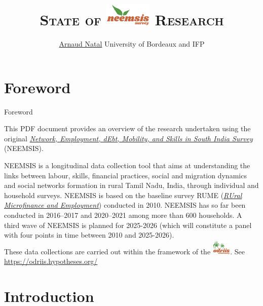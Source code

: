 \documentclass[aspectratio=169]{beamer}
\title[NEEMSIS State of Research]{\textsc{State of \includegraphics[height=1.5em]{Beamer_theme/neemsis} Research}}
\author[A. Natal]{\href{https://neemsis.hypotheses.org/team/arnaud-natal}{\textcolor{ODRIISdarkgreen}{Arnaud Natal}} \small\textcolor{ODRIISlightgreen}{University of Bordeaux and IFP}}
\institute{\\ \small September, 2025 \\ \scriptsize \href{https://neemsis.hypotheses.org/}{\textcolor{ODRIISbrick}{https://neemsis.hypotheses.org/}}}
\begin{document}
\maketitle




\section*{Foreword}
\begin{frame}{Foreword}
\begin{small}


This PDF document provides an overview of the research undertaken using the original \href{https://neemsis.hypotheses.org}{\textit{Network, Employment, dEbt, Mobility, and Skills in South India Survey}} (NEEMSIS).

\begin{brickbox}
NEEMSIS is a longitudinal data collection tool that aims at understanding the links between labour, skills, financial practices, social and migration dynamics and social networks formation in rural Tamil Nadu, India, through individual and household surveys.  NEEMSIS is based on the baseline survey RUME (\href{https://odriis.hypotheses.org/rume}{\textit{RUral Microfinance and Employment}}) conducted in 2010. NEEMSIS has so far been conducted in 2016–2017 and 2020–2021 among more than 600 households. A third wave of NEEMSIS is planned for 2025-2026 (which will constitute a panel with four points in time between 2010 and 2025-2026). \\
These data collections are carried out within the framework of the \href{https://odriis.hypotheses.org/}{\includegraphics[height=2em]{Beamer_theme/odriis}}. See \href{https://odriis.hypotheses.org/}{https://odriis.hypotheses.org/}
\end{brickbox}

\end{small}
\end{frame}



\section*{Introduction}
\begin{frame}
\label{introduction}


\end{frame}
\end{document}
